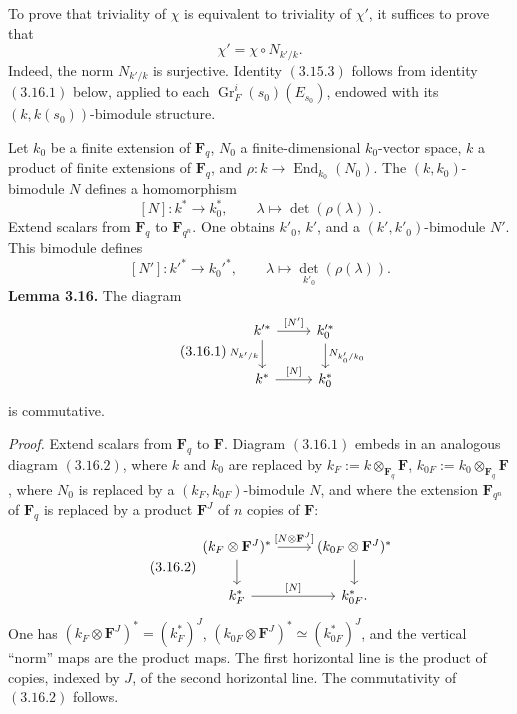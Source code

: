 \documentclass[11pt]{article}
\newcommand{\Fq}{\mathbf F_q}
\newcommand{\F}{\mathbf F}
\newcommand{\End}{\operatorname{End}}
\newcommand{\Gr}{\operatorname{Gr}}
\begin{document}
To prove that triviality of \(\chi\) is equivalent to triviality of \(\chi'\), it suffices to prove that
\begin{equation}\tag{3.15.3}
\chi'=\chi\circ N_{k'/k}.
\end{equation}
Indeed, the norm \(N_{k'/k}\) is surjective. Identity \((3.15.3)\) follows from identity \((3.16.1)\) below, applied to each \(\Gr^i_F(s_0)(E_{s_0})\), endowed with its \((k,k(s_0))\)-bimodule structure.

Let \(k_0\) be a finite extension of \(\Fq\), \(N_0\) a finite-dimensional \(k_0\)-vector space, \(k\) a product of finite extensions of \(\Fq\), and \(\rho:k\to\End_{k_0}(N_0)\). The \((k,k_0)\)-bimodule \(N\) defines a homomorphism
\[
[N]:k^*\to k_0^*,\qquad \lambda\mapsto \det(\rho(\lambda)).
\]
Extend scalars from \(\Fq\) to \(\mathbf F_{q^n}\). One obtains \(k'_0\), \(k'\), and a \((k',k'_0)\)-bimodule \(N'\). This bimodule defines
\[
[N']:k'^*\to k_0'^*,\qquad \lambda\mapsto \det_{k'_0}(\rho(\lambda)).
\]
\textbf{Lemma 3.16.} The diagram
\begin{equation}\tag{3.16.1}
\begin{tikzcd}
k'^* \arrow[r,"{[N']}"] \arrow[d,"N_{k'/k}"'] & k_0'^* \arrow[d,"N_{k'_0/k_0}"]\\
k^* \arrow[r,"{[N]}"] & k_0^*
\end{tikzcd}
\end{equation}
is commutative.

\emph{Proof.} Extend scalars from \(\Fq\) to \(\F\). Diagram \((3.16.1)\) embeds in an analogous diagram \((3.16.2)\), where \(k\) and \(k_0\) are replaced by \(k_F:=k\otimes_{\Fq}\F\), \(k_{0F}:=k_0\otimes_{\Fq}\F\), where \(N_0\) is replaced by a \((k_F,k_{0F})\)-bimodule \(N\), and where the extension \(\mathbf F_{q^n}\) of \(\Fq\) is replaced by a product \(\F^J\) of \(n\) copies of \(\F\):
\begin{equation}\tag{3.16.2}
\begin{tikzcd}
(k_F\otimes \F^J)^* \arrow[r,"{[N\otimes \F^J]}"] \arrow[d] & (k_{0F}\otimes \F^J)^* \arrow[d]\\
k_F^* \arrow[r,"{[N]}"] & k_{0F}^*.
\end{tikzcd}
\end{equation}
One has \((k_F\otimes\F^J)^*=(k_F^*)^J\), \((k_{0F}\otimes\F^J)^*\simeq(k_{0F}^*)^J\), and the vertical ``norm'' maps are the product maps. The first horizontal line is the product of copies, indexed by \(J\), of the second horizontal line. The commutativity of \((3.16.2)\) follows.
\end{document}
